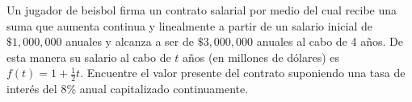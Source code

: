 \item Un jugador de beisbol firma un contrato salarial por medio del cual recibe una suma que aumenta continua y linealmente a partir de un salario inicial de $\$1,000,000$ anuales y alcanza a ser de $\$3,000,000$ anuales al cabo de 4 años. De esta manera su salario al cabo de $t$ años (en millones de dólares) es $f(t) = 1 + \frac{1}{2}t$. Encuentre el valor presente del contrato suponiendo una tasa de interés del 8\% anual capitalizado continuamente.

